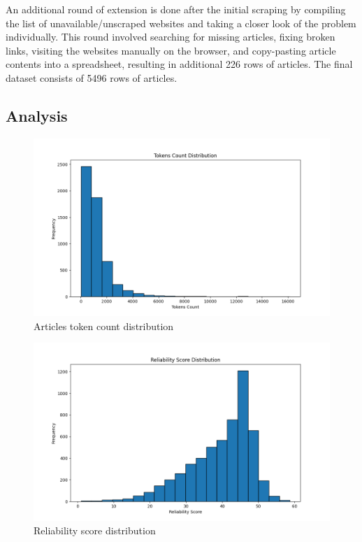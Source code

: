 An additional round of extension is done after the initial scraping by compiling the list of unavailable/unscraped websites and taking a closer look of the problem individually. This round involved searching for missing articles, fixing broken links, visiting the websites manually on the browser, and copy-pasting article contents into a spreadsheet, resulting in additional 226 rows of articles. The final dataset consists of 5496 rows of articles.

\subsection{Analysis}

\begin{figure}[htbp]
    \centering
    \includegraphics[width=0.9\linewidth]{figures/tokens_count_vx_hist.png}
    \caption{Articles token count distribution}
    \label{fig:tokens_hist}
\end{figure}

\begin{figure}[htbp]
    \centering
    \includegraphics[width=0.9\linewidth]{figures/reliability_score_hist.png}
    \caption{Reliability score distribution}
    \label{fig:reliability_score_hist}
\end{figure}

